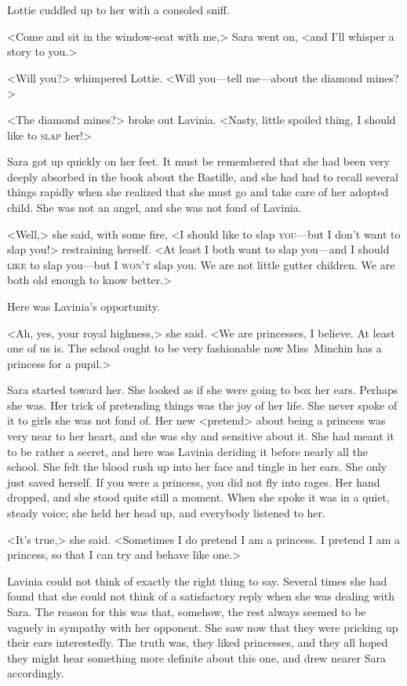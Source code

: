 Lottie cuddled up to her with a consoled sniff.

<Come and sit in the window-seat with me,> Sara went on, <and I'll whisper a story to you.>

<Will you?> whimpered Lottie. <Will you—tell me—about the diamond mines?>

<The diamond mines?> broke out Lavinia. <Nasty, little spoiled thing, I should like to \textsc{slap} her!>

Sara got up quickly on her feet. It must be remembered that she had been very deeply absorbed in the book about the Bastille, and she had had to recall several things rapidly when she realized that she must go and take care of her adopted child. She was not an angel, and she was not fond of Lavinia.

<Well,> she said, with some fire, <I should like to slap \textsc{you}—but I don't want to slap you!> restraining herself. <At least I both want to slap you—and I should \textsc{like} to slap you—but I \textsc{won't} slap you. We are not little gutter children. We are both old enough to know better.>

Here was Lavinia's opportunity.

<Ah, yes, your royal highness,> she said. <We are princesses, I believe. At least one of us is. The school ought to be very fashionable now Miss~Minchin has a princess for a pupil.>

Sara started toward her. She looked as if she were going to box her ears. Perhaps she was. Her trick of pretending things was the joy of her life. She never spoke of it to girls she was not fond of. Her new <pretend> about being a princess was very near to her heart, and she was shy and sensitive about it. She had meant it to be rather a secret, and here was Lavinia deriding it before nearly all the school. She felt the blood rush up into her face and tingle in her ears. She only just saved herself. If you were a princess, you did not fly into rages. Her hand dropped, and she stood quite still a moment. When she spoke it was in a quiet, steady voice; she held her head up, and everybody listened to her.

<It's true,> she said. <Sometimes I do pretend I am a princess. I pretend I am a princess, so that I can try and behave like one.>

Lavinia could not think of exactly the right thing to say. Several times she had found that she could not think of a satisfactory reply when she was dealing with Sara. The reason for this was that, somehow, the rest always seemed to be vaguely in sympathy with her opponent. She saw now that they were pricking up their ears interestedly. The truth was, they liked princesses, and they all hoped they might hear something more definite about this one, and drew nearer Sara accordingly.

